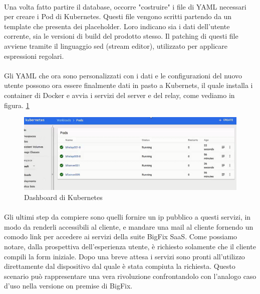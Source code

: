 \paragraph{}
Una volta fatto partire il database, occorre "costruire" i file di YAML necessari per creare i Pod di Kubernetes. Questi file vengono scritti partendo da un template che presenta dei placeholder. Loro indicano sia i dati dell'utente corrente, sia le versioni di build del prodotto stesso. Il patching di questi file avviene tramite il linguaggio sed (stream editor), utilizzato per applicare espressioni regolari.
\paragraph{}
Gli YAML che ora sono personalizzati con i dati e le configurazioni del nuovo utente possono ora essere finalmente dati in pasto a Kubernets, il quale installa i container di Docker e avvia i servizi del server e del relay, come vediamo in figura. \ref{fig:kubedashboard}
\begin{figure}[h]
	\centering
	\includegraphics[width=0.7\linewidth]{capitoli/imgs/kubedashboard}
	\caption{Dashboard di Kubernetes}
	\label{fig:kubedashboard}
\end{figure}
\paragraph{}
Gli ultimi step da compiere sono quelli fornire un ip pubblico a questi servizi, in modo da renderli accessibili al cliente, e mandare una mail al cliente fornendo un comodo link per accedere ai servizi della suite BigFix SaaS. Come possiamo notare, dalla prospettiva dell'esperienza utente, è richiesto solamente che il cliente compili la form iniziale. Dopo una breve attesa i servizi sono pronti all'utilizzo direttamente dal dispositivo dal quale è stata compiuta la richiesta. Questo scenario può rappresentare una vera rivoluzione confrontandolo con l'analogo caso d'uso nella versione on premise di BigFix.

